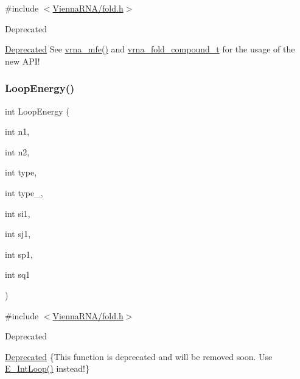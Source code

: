 {\ttfamily \#include $<$\hyperlink{fold_8h}{Vienna\+R\+N\+A/fold.\+h}$>$}

\begin{DoxyRefDesc}{Deprecated}
\item[\hyperlink{deprecated__deprecated000075}{Deprecated}]See \hyperlink{group__mfe__global_gabd3b147371ccf25c577f88bbbaf159fd}{vrna\+\_\+mfe()} and \hyperlink{group__fold__compound_ga1b0cef17fd40466cef5968eaeeff6166}{vrna\+\_\+fold\+\_\+compound\+\_\+t} for the usage of the new A\+P\+I!\end{DoxyRefDesc}
\mbox{\label{group__mfe__global__deprecated_ga2163034a25c6115d894b199e97e03f6c}} 
\subsubsection{\texorpdfstring{Loop\+Energy()}{LoopEnergy()}}
{\footnotesize\ttfamily int Loop\+Energy (\begin{DoxyParamCaption}\item[{int}]{n1,  }\item[{int}]{n2,  }\item[{int}]{type,  }\item[{int}]{type\+\_,  }\item[{int}]{si1,  }\item[{int}]{sj1,  }\item[{int}]{sp1,  }\item[{int}]{sq1 }\end{DoxyParamCaption})}



{\ttfamily \#include $<$\hyperlink{fold_8h}{Vienna\+R\+N\+A/fold.\+h}$>$}

\begin{DoxyRefDesc}{Deprecated}
\item[\hyperlink{deprecated__deprecated000076}{Deprecated}]\{This function is deprecated and will be removed soon. Use \hyperlink{group__eval__deprecated_gaafbc187b7f78e8e82afb77dd6f3b8fc5}{E\+\_\+\+Int\+Loop()} instead!\} \end{DoxyRefDesc}
\mbox{\label{group__mfe__global__deprecated_gab327ce11972f5ac069d52c8dedfdb700}} 
